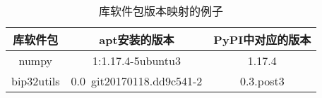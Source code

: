 \begin{table}[htbp]
	\centering
	\begin{threeparttable}
		\caption{库软件包版本映射的例子}
		\label{tab:version}
		\begin{tabularx}{0.66\textwidth}{ccc}
			\toprule
			\textbf{库软件包}&\textbf{apt安装的版本}&\textbf{PyPI中对应的版本}\\
			\midrule
			numpy&1:1.17.4-5ubuntu3&1.17.4\\
			bip32utils&0.0~git20170118.dd9c541-2&0.3.post3\\
			\bottomrule
		\end{tabularx}
	\end{threeparttable}
\end{table}